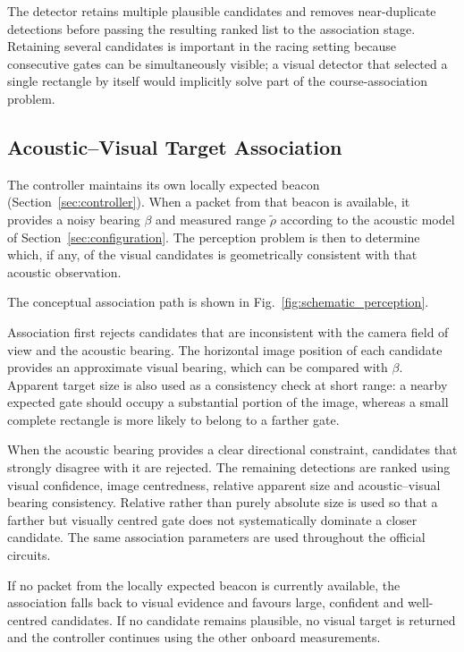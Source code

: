 The detector retains multiple plausible candidates and removes near-duplicate
detections before passing the resulting ranked list to the association stage.
Retaining several candidates is important in the racing setting because
consecutive gates can be simultaneously visible; a visual detector that selected
a single rectangle by itself would implicitly solve part of the
course-association problem.


\subsection{Acoustic--Visual Target Association}

The controller maintains its own locally expected beacon
(Section~\ref{sec:controller}). When a packet from that beacon is available, it
provides a noisy bearing $\beta$ and measured range $\tilde{\rho}$ according to
the acoustic model of Section~\ref{sec:configuration}. The perception problem is
then to determine which, if any, of the visual candidates is geometrically
consistent with that acoustic observation.

The conceptual association path is shown in
Fig.~\ref{fig:schematic_perception}.


Association first rejects candidates that are inconsistent with the camera field
of view and the acoustic bearing. The horizontal image position of each
candidate provides an approximate visual bearing, which can be compared with
$\beta$. Apparent target size is also used as a consistency check at short range:
a nearby expected gate should occupy a substantial portion of the image, whereas
a small complete rectangle is more likely to belong to a farther gate.

When the acoustic bearing provides a clear directional constraint, candidates
that strongly disagree with it are rejected. The remaining detections are
ranked using visual confidence, image centredness, relative apparent size and
acoustic--visual bearing consistency. Relative rather than purely absolute size
is used so that a farther but visually centred gate does not systematically
dominate a closer candidate. The same association parameters are used throughout
the official circuits.

If no packet from the locally expected beacon is currently available, the
association falls back to visual evidence and favours large, confident and
well-centred candidates. If no candidate remains plausible, no visual target is
returned and the controller continues using the other onboard measurements.

